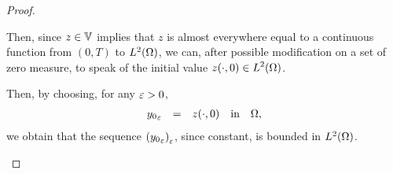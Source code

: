\begin{proof}
\begin{enumerate}
            Then, since $z\in \mathbb{V}$ implies that $z$ is almost everywhere
            equal to a continuous function from $(0,T)$ to
            $L^{2}\!\left({\Omega}\right)$, we can, after possible modification on a set
            of zero measure, to speak of the initial value $\displaystyle
            {z}\!\left({\cdot, 0}\right)\in L^{2}\!\left({\Omega}\right)$.

            Then, by choosing, for any $\varepsilon > 0$,
            \begin{equation*}
                \begin{array}{rclll}
                    {y_{0}}_{\varepsilon} & = & {z}\!\left({\cdot, 0}\right) & \text{in} &
                    \Omega,
                \end{array}
            \end{equation*}
            we obtain that the sequence
            ${\left({{y_{0}}_{\varepsilon}}\right)}_{\varepsilon}$, since constant, is
            bounded in $L^{2}\!\left({\Omega}\right)$.
    \end{enumerate}
\end{proof}
